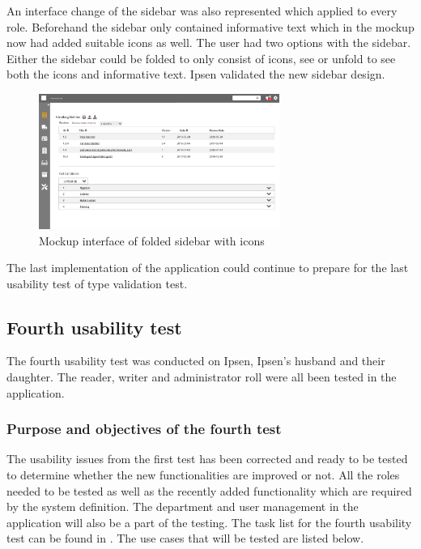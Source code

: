 An interface change of the sidebar was also represented which applied to every role.
Beforehand the sidebar only contained informative text which in the mockup now had added suitable icons as well.
The user had two options with the sidebar.
Either the sidebar could be folded to only consist of icons, see  or unfold to see both the icons and informative text.
Ipsen validated the new sidebar design.

\begin{figure}[H]
	\centering
		\includegraphics[width=0.7\textwidth]{billeder/ForsideFoldedSidebar.jpg}
	\caption{Mockup interface of folded sidebar with icons}\label{fig:mockupSidebarIcon}
\end{figure}

The last implementation of the application could continue to prepare for the last usability test of type validation test.

\subsection{Fourth usability test}\label{fourthtest}
The fourth usability test was conducted on Ipsen, Ipsen's husband and their daughter.
The reader, writer and administrator roll were all been tested in the application.

\subsubsection*{Purpose and objectives of the fourth test}
The usability issues from the first test has been corrected and ready to be tested to determine whether the new functionalities are improved or not.
All the roles needed to be tested as well as the recently added functionality which are required by the system definition.
The department and user management in the application will also be a part of the testing. The task list for the fourth usability test can be found in .
The use cases that will be tested are listed below.

